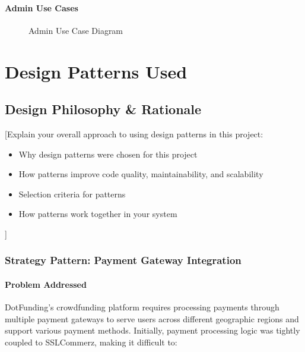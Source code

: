 \documentclass[a4paper,12pt]{report}
\begin{document}
\subsubsection{Admin Use Cases}

\begin{figure}[h]
    \centering
    \caption{Admin Use Case Diagram}
    \label{fig:usecase-admin}
\end{figure}

\chapter{Design Patterns Used}

\section{Design Philosophy \& Rationale}

[Explain your overall approach to using design patterns in this project:
\begin{itemize}
    \item Why design patterns were chosen for this project
    \item How patterns improve code quality, maintainability, and scalability
    \item Selection criteria for patterns
    \item How patterns work together in your system
\end{itemize}]

\subsection{Strategy Pattern: Payment Gateway Integration}

\subsubsection{Problem Addressed}

DotFunding's crowdfunding platform requires processing payments through multiple payment gateways to serve users across different geographic regions and support various payment methods. Initially, payment processing logic was tightly coupled to SSLCommerz, making it difficult to:
\end{document}
